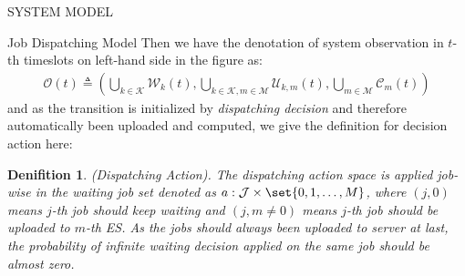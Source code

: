 \documentclass[10pt, conference, letterpaper]{IEEEtran}
\newtheorem{definition}{Denifition}
\DeclarePairedDelimiter\set\{\}
\newcommand{\apSet}{\mathcal{K}}
\newcommand{\esSet}{\mathcal{M}}
\newcommand{\jSet}{\mathcal{J}}
\newcommand{\wSet}{\mathcal{W}}
\newcommand{\uSet}{\mathcal{U}}
\newcommand{\cSet}{\mathcal{C}}
\begin{document}
\begin{section}{SYSTEM MODEL}
\begin{subsection}{Job Dispatching Model}
            Then we have the denotation of system observation in $t$-th timeslots on left-hand side in the figure as:
            \begin{align}
                \mathcal{O}(t) \triangleq (\bigcup\limits_{k\in\apSet}\wSet_{k}(t), \bigcup\limits_{k\in\apSet, m\in\esSet}\uSet_{k,m}(t), \bigcup\limits_{m\in\esSet}\cSet_{m}(t))
            \end{align}
            and as the transition is initialized by \emph{dispatching decision} and therefore automatically been uploaded and computed, we give the definition for decision action here:
            \begin{definition}
                (Dispatching Action).
                The dispatching action space is applied job-wise in the waiting job set denoted as $a: \jSet \times \set{0,1,\dots,M}$, where $(j, 0)$ means $j$-th job should keep waiting and $(j,m\neq0)$ means $j$-th job should be uploaded to $m$-th ES. As the jobs should always been uploaded to server at last, the probability of infinite waiting decision applied on the same job should be almost zero.
            \end{definition}


\end{subsection}
\end{section}
\end{document}
